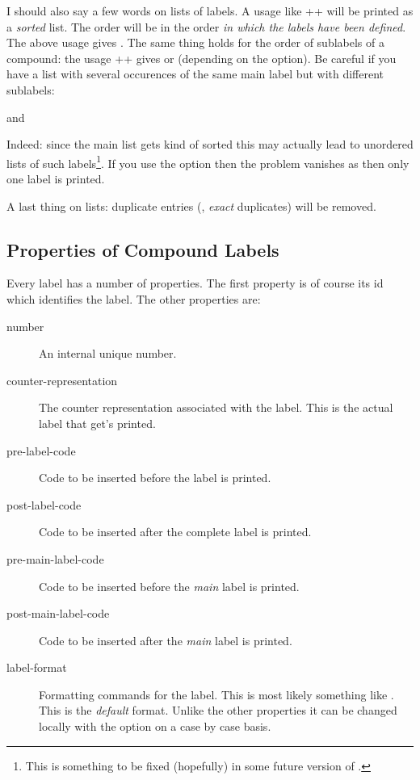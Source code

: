 \documentclass[load-preamble+,babel-options={ngerman,british,american}]{cnltx-doc}
\begin{document}
I should also say a few words on lists of labels.  A usage like
\verbcode++ will be printed as a \emph{sorted} list.  The order
will be in the order \emph{in which the labels have been defined}.  The above
usage gives .  The same thing holds for the order of sublabels
of a compound: the usage \verbcode++ gives
 or
 (depending on the
 option).  Be careful if you have a list with several
occurences of the same main label but with different sublabels:
\begin{example}
   and  \par
   \par
   \par
\end{example}
Indeed: since the main list gets kind of sorted this may actually lead to
unordered lists of such labels\footnote{This is something to be fixed
  (hopefully) in some future version of \chemnum.}.  If you use the option
 then the problem vanishes as then only one label is printed.

A last thing on lists: duplicate entries (\ie, \emph{exact} duplicates) will
be removed.

\subsection{Properties of Compound Labels}\label{sec:prop-comp-labels}

Every label has a number of properties.  The first property is of course its
\ac{id} which identifies the label.  The other properties are:
\begin{description}
  \item[number] An internal unique number.
  \item[counter-representation] The counter representation associated with the
    label.  This is the actual label that get's printed.
  \item[pre-label-code] Code to be inserted before the label is printed.
  \item[post-label-code] Code to be inserted after the complete label is
    printed.
  \item[pre-main-label-code] Code to be inserted before the \emph{main} label
    is printed.
  \item[post-main-label-code] Code to be inserted after the \emph{main} label
    is printed.
  \item[label-format] Formatting commands for the label.  This is most likely
    something like .  This is the \emph{default} format.  Unlike
    the other properties it can be changed locally with the 
    option on a case by case basis.
\end{description}
\end{document}
